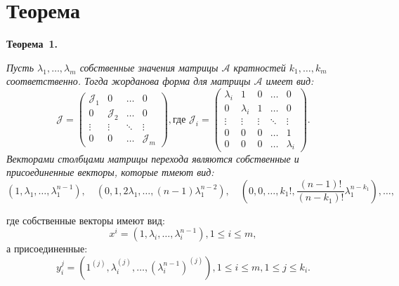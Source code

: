 \section{Теорема}
\textbf{Теорема~1.}
{ \it Пусть $\lambda_1, \ldots , \lambda_m$ собственные значения матрицы $\mathcal{A}$ кратностей $k_1, \ldots , k_m$ соответственно. Тогда жорданова форма для матрицы $\mathcal{A}$ имеет вид:
$$
	\mathcal{J} = \begin{pmatrix}
		\mathcal{J}_1 & 0 & \dots & 0 \\
		0 & \mathcal{J}_2 & \dots & 0 \\
		\vdots & \vdots & \ddots & \vdots \\
		0 & 0 & \dots & \mathcal{J}_m
	\end{pmatrix}, {\text{где }}
	\mathcal{J}_i = \begin{pmatrix}
		\lambda_i & 1 & 0 & \dots & 0 \\
		0 & \lambda_i & 1 & \dots & 0 \\
		\vdots & \vdots & \vdots & \ddots & \vdots \\
		0 & 0 & 0 & \dots & 1 \\
		0 & 0 & 0 & \dots & \lambda_i
	\end{pmatrix}.
$$
Векторами столбцами матрицы перехода являются собственные и присоединенные векторы, которые тмеют вид:
$$
(1, \lambda_1, \ldots, \lambda_1^{n-1}), \quad (0, 1, 2\lambda_1, \ldots, (n-1)\lambda_1^{n-2}), \quad (0, 0, \ldots, k_1!, \frac{(n-1)!}{(n-k_1)!}\lambda_1^{n-k_1}), \ldots,
$$






где собственные векторы имеют вид: 
$$x^i =(1, \lambda_i, \ldots, \lambda_i^{n-1}), 1 \leqslant i \leqslant m,$$
а присоединенные:
$$y_i^j = (1^{(j)}, \lambda_i^{(j)}, \ldots , (\lambda_i^{n-1})^{(j)}), 1 \leqslant i \leqslant m, 1 \leqslant j \leqslant k_i.$$} 


